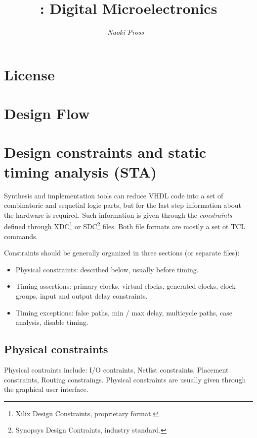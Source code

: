 \documentclass[margin=small]{tex/hsrzf}
\author{\textsl{Naoki Pross} -- \texttt{\theauthoremail}}
\title{\texttt{\themodule}: Digital Microelectronics}
\date{\thesemester}
\begin{document}
\maketitle
\tableofcontents

\section{License}
\doclicenseThis

\twocolumn
\setcounter{page}{1}


\section{Design Flow}

\section{Design constraints and static timing analysis (STA)}

Synthesis and implementation tools can reduce VHDL code into a set of combinatoric and sequetial logic parts, but for the last step information about the hardware is required. Such information is given through the \emph{constraints} defined through XDC\footnote{Xilix Design Constraints, proprietary format.}  or SDC\footnote{Synopsys Design Contraints, industry standard.} files. Both file formats are mostly a set ot TCL commands.

Constraints should be generally organized in three sections (or separate files):
\begin{itemize}
  \item Physical constraints: described below, usually before timing.
  \item Timing assertions: primary clocks, virtual clocks, generated clocks, clock groups, input and output delay constraints.
  \item Timing exceptions: false paths, min / max delay, multicycle paths, case analysis, disable timing.
\end{itemize}

\subsection{Physical constraints}

Physical contraints include: I/O contraints, Netlist constraints, Placement constraints, Routing constraings. Physical constraints are usually given through the graphical user interface.
\end{document}
